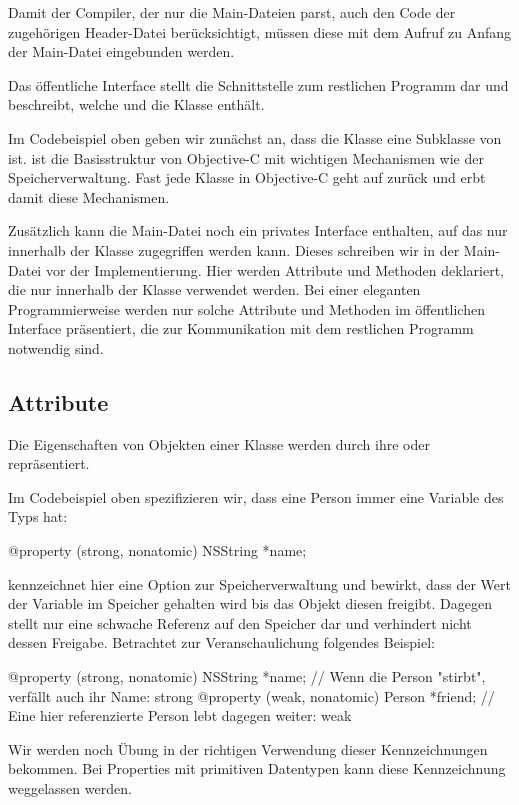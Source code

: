 \documentclass[parskip=half, final]{scrreprt}
\begin{document}
Damit der Compiler, der nur die Main-Dateien parst, auch den Code der zugehörigen Header-Datei berücksichtigt, müssen diese mit dem Aufruf  zu Anfang der Main-Datei eingebunden werden.

Das öffentliche Interface stellt die Schnittstelle zum restlichen Programm dar und beschreibt, welche  und  die Klasse enthält.

Im Codebeispiel oben geben wir zunächst an, dass die Klasse  eine Subklasse von  ist.  ist die Basisstruktur von Objective-C mit wichtigen Mechanismen wie der Speicherverwaltung. Fast jede Klasse in Objective-C geht auf  zurück und erbt damit diese Mechanismen.

Zusätzlich kann die Main-Datei noch ein privates Interface enthalten, auf das nur innerhalb der Klasse zugegriffen werden kann. Dieses schreiben wir in der Main-Datei vor der Implementierung. Hier werden Attribute und Methoden deklariert, die nur innerhalb der Klasse verwendet werden. Bei einer eleganten Programmierweise werden nur solche Attribute und Methoden im öffentlichen Interface präsentiert, die zur Kommunikation mit dem restlichen Programm notwendig sind.

\subsection{Attribute}\label{sec:properties}

Die Eigenschaften von Objekten einer Klasse werden durch ihre  oder  repräsentiert.

Im Codebeispiel oben  spezifizieren wir, dass eine Person immer eine Variable  des Typs  hat:

\begin{objclst}
@property (strong, nonatomic) NSString *name;
\end{objclst}

 kennzeichnet hier eine Option zur Speicherverwaltung und bewirkt, dass der Wert der Variable im Speicher gehalten wird bis das Objekt diesen freigibt. Dagegen stellt  nur eine schwache Referenz auf den Speicher dar und verhindert nicht dessen Freigabe. Betrachtet zur Veranschaulichung folgendes Beispiel:
\begin{objclst}
@property (strong, nonatomic) NSString *name; // Wenn die Person "stirbt", verfällt auch ihr Name: strong
@property (weak, nonatomic) Person *friend; // Eine hier referenzierte Person lebt dagegen weiter: weak
\end{objclst}
Wir werden noch Übung in der richtigen Verwendung dieser Kennzeichnungen bekommen. Bei Properties mit primitiven Datentypen kann diese Kennzeichnung weggelassen werden.
\end{document}
